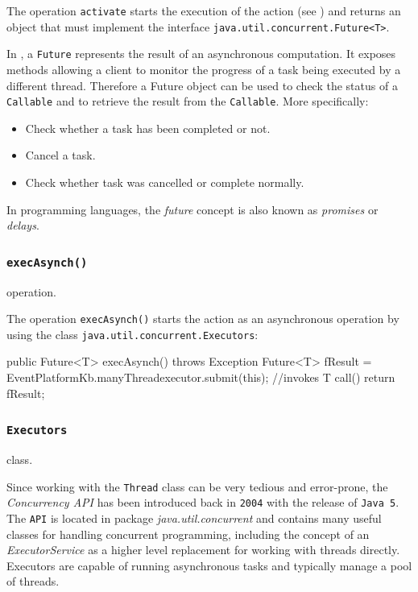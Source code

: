 The operation \texttt{activate} starts the execution of the action (see ) and returns an object that must implement the interface \texttt{java.util.concurrent.Future<T>}. 

In \java{}, a \texttt{Future} represents the result of an asynchronous computation. It exposes methods allowing a client to monitor the progress of a task being executed by a different thread. Therefore a Future object can be used to check the status of a \texttt{Callable} and to retrieve the result from the \texttt{Callable}. More specifically:
\begin{itemize}
\item Check whether a task has been completed or not.
\item  Cancel a task.
\item Check whether task was cancelled or complete normally.
\end{itemize}
 
In programming languages, the \textit{future} concept is also known as \textit{promises} or \textit{delays}.


\subsubsection{\texttt{execAsynch()}} operation.\\

The operation \texttt{execAsynch()} starts the action as an asynchronous operation by using the class \texttt{java.util.concurrent.Executors}:
\begin{javacode}
	public Future<T> execAsynch() throws Exception{
		Future<T> fResult = 
			EventPlatformKb.manyThreadexecutor.submit(this); //invokes T call()
		return fResult;
 	}
\end{javacode} 

\subsubsection{\texttt{Executors}} class.\\

Since working with the \texttt{Thread} class can be very tedious and error-prone, the \textit{Concurrency API} has been introduced back in \texttt{2004} with the release of \texttt{Java 5}. The \texttt{API} is located in package \textit{java.util.concurrent} and contains many useful classes for handling concurrent programming, including the concept of an \textit{ExecutorService} as a higher level replacement for working with threads directly. Executors are capable of running asynchronous tasks and typically manage a pool of threads. 

